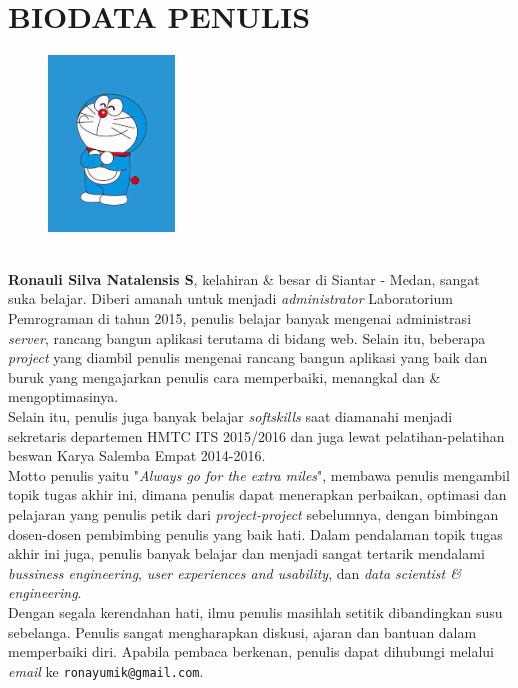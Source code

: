 \chapter{BIODATA PENULIS}
		\begin{figure}
			\includegraphics[width=0.3\textwidth]{images/foto-diri.jpg}
		\end{figure}
		\textbf{\ \\Ronauli Silva Natalensis S}, kelahiran \& besar di Siantar - Medan, sangat suka belajar. Diberi amanah untuk menjadi \textit{administrator} Laboratorium Pemrograman di tahun 2015, penulis belajar banyak mengenai administrasi \textit{server}, rancang bangun aplikasi terutama di bidang web. Selain itu, beberapa \textit{project} yang diambil penulis mengenai rancang bangun aplikasi yang baik dan buruk yang mengajarkan penulis cara memperbaiki, menangkal dan \& mengoptimasinya.\\
		Selain itu, penulis juga banyak belajar \textit{softskills} saat diamanahi menjadi sekretaris departemen HMTC ITS 2015/2016 dan juga lewat pelatihan-pelatihan beswan Karya Salemba Empat 2014-2016.\\
		\indent Motto penulis yaitu "\textit{Always go for the extra miles}", membawa penulis mengambil topik tugas akhir ini, dimana penulis dapat menerapkan perbaikan, optimasi dan pelajaran yang penulis petik dari \textit{project-project} sebelumnya, dengan bimbingan dosen-dosen pembimbing penulis yang baik hati. Dalam pendalaman topik tugas akhir ini juga, penulis banyak belajar dan menjadi sangat tertarik mendalami \textit{bussiness engineering}, \textit{user experiences and usability}, dan \textit{data scientist \& engineering}. \\
		\indent Dengan segala kerendahan hati, ilmu penulis masihlah setitik dibandingkan susu sebelanga. Penulis sangat mengharapkan diskusi, ajaran dan bantuan dalam memperbaiki diri. Apabila pembaca berkenan, penulis dapat dihubungi melalui \textit{email} ke \texttt{ronayumik@gmail.com}.



